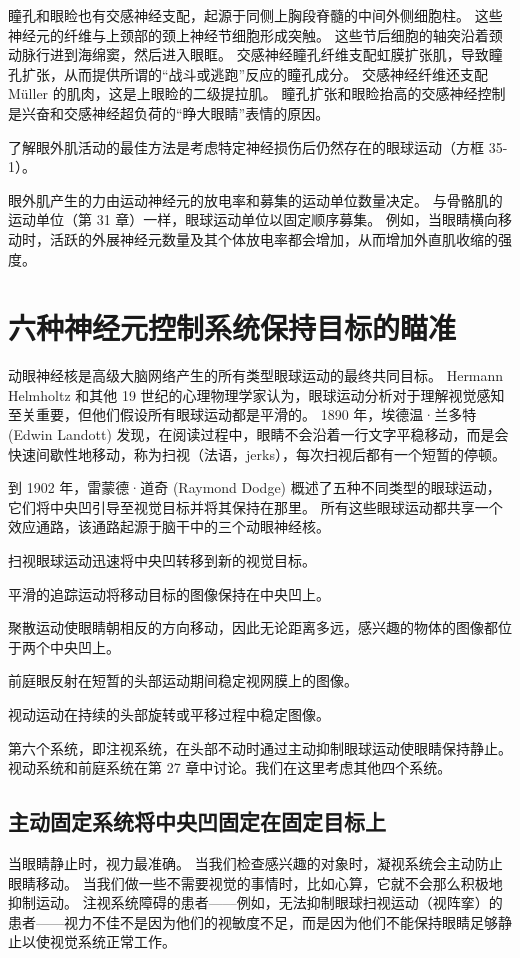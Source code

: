 瞳孔和眼睑也有交感神经支配，起源于同侧上胸段脊髓的中间外侧细胞柱。 这些神经元的纤维与上颈部的颈上神经节细胞形成突触。 这些节后细胞的轴突沿着颈动脉行进到海绵窦，然后进入眼眶。 交感神经瞳孔纤维支配虹膜扩张肌，导致瞳孔扩张，从而提供所谓的“战斗或逃跑”反应的瞳孔成分。 交感神经纤维还支配 Müller 的肌肉，这是上眼睑的二级提拉肌。 瞳孔扩张和眼睑抬高的交感神经控制是兴奋和交感神经超负荷的“睁大眼睛”表情的原因。


了解眼外肌活动的最佳方法是考虑特定神经损伤后仍然存在的眼球运动（方框 35-1）。

眼外肌产生的力由运动神经元的放电率和募集的运动单位数量决定。 与骨骼肌的运动单位（第 31 章）一样，眼球运动单位以固定顺序募集。 例如，当眼睛横向移动时，活跃的外展神经元数量及其个体放电率都会增加，从而增加外直肌收缩的强度。

\section{六种神经元控制系统保持目标的瞄准}
动眼神经核是高级大脑网络产生的所有类型眼球运动的最终共同目标。 Hermann Helmholtz 和其他 19 世纪的心理物理学家认为，眼球运动分析对于理解视觉感知至关重要，但他们假设所有眼球运动都是平滑的。 1890 年，埃德温·兰多特 (Edwin Landott) 发现，在阅读过程中，眼睛不会沿着一行文字平稳移动，而是会快速间歇性地移动，称为扫视（法语，jerks），每次扫视后都有一个短暂的停顿。

到 1902 年，雷蒙德·道奇 (Raymond Dodge) 概述了五种不同类型的眼球运动，它们将中央凹引导至视觉目标并将其保持在那里。 所有这些眼球运动都共享一个效应通路，该通路起源于脑干中的三个动眼神经核。

扫视眼球运动迅速将中央凹转移到新的视觉目标。

平滑的追踪运动将移动目标的图像保持在中央凹上。

聚散运动使眼睛朝相反的方向移动，因此无论距离多远，感兴趣的物体的图像都位于两个中央凹上。

前庭眼反射在短暂的头部运动期间稳定视网膜上的图像。

视动运动在持续的头部旋转或平移过程中稳定图像。


第六个系统，即注视系统，在头部不动时通过主动抑制眼球运动使眼睛保持静止。 视动系统和前庭系统在第 27 章中讨论。我们在这里考虑其他四个系统。

\subsection{主动固定系统将中央凹固定在固定目标上}
当眼睛静止时，视力最准确。 当我们检查感兴趣的对象时，凝视系统会主动防止眼睛移动。 当我们做一些不需要视觉的事情时，比如心算，它就不会那么积极地抑制运动。 注视系统障碍的患者——例如，无法抑制眼球扫视运动（视阵挛）的患者——视力不佳不是因为他们的视敏度不足，而是因为他们不能保持眼睛足够静止以使视觉系统正常工作。

